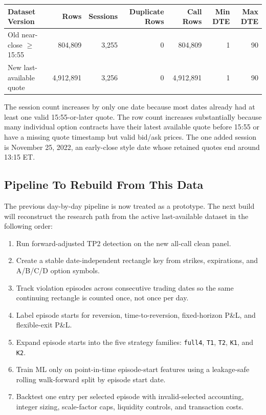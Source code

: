 \documentclass[11pt]{article}
\begin{document}
\begin{center}
\begin{tabular}{lrrrrrr}
\toprule
Dataset Version & Rows & Sessions & Duplicate Rows & Call Rows & Min DTE & Max DTE \\
\midrule
Old near-close $\geq$15:55 & 804,809 & 3,255 & 0 & 804,809 & 1 & 90 \\
New last-available quote & 4,912,891 & 3,256 & 0 & 4,912,891 & 1 & 90 \\
\bottomrule
\end{tabular}
\end{center}

The session count increases by only one date because most dates already had at
least one valid 15:55-or-later quote. The row count increases substantially
because many individual option contracts have their latest available quote
before 15:55 or have a missing quote timestamp but valid bid/ask prices. The
one added session is November 25, 2022, an early-close style date whose retained
quotes end around 13:15 ET.

\subsection*{Pipeline To Rebuild From This Data}

The previous day-by-day pipeline is now treated as a prototype. The next build
will reconstruct the research path from the active last-available dataset in
the following order:

\begin{enumerate}
  \item Run forward-adjusted TP2 detection on the new all-call clean panel.
  \item Create a stable date-independent rectangle key from strikes,
  expirations, and A/B/C/D option symbols.
  \item Track violation episodes across consecutive trading dates so the same
  continuing rectangle is counted once, not once per day.
  \item Label episode starts for reversion, time-to-reversion, fixed-horizon
  P\&L, and flexible-exit P\&L.
  \item Expand episode starts into the five strategy families:
  \texttt{full4}, \texttt{T1}, \texttt{T2}, \texttt{K1}, and \texttt{K2}.
  \item Train ML only on point-in-time episode-start features using a
  leakage-safe rolling walk-forward split by episode start date.
  \item Backtest one entry per selected episode with invalid-selected accounting,
  integer sizing, scale-factor caps, liquidity controls, and transaction costs.
\end{enumerate}
\end{document}
